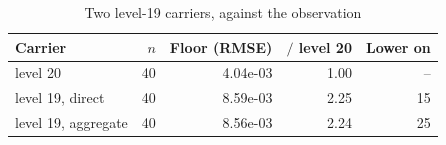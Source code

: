 \begin{table}[t]
\centering
\caption{Two level-19 carriers, against the observation}
\label{tab:level19_direct}
\footnotesize
\setlength{\tabcolsep}{4pt}
\begin{tabular}{@{}lrrrr@{}}
\toprule
Carrier & $n$ & Floor (RMSE) & $/$ level 20 & Lower on \\
\midrule
level 20 & 40 & 4.04e-03 & 1.00 & -- \\
\midrule
level 19, direct & 40 & 8.59e-03 & 2.25 & 15 \\
level 19, aggregate & 40 & 8.56e-03 & 2.24 & 25 \\
\bottomrule
\end{tabular}
\end{table}
